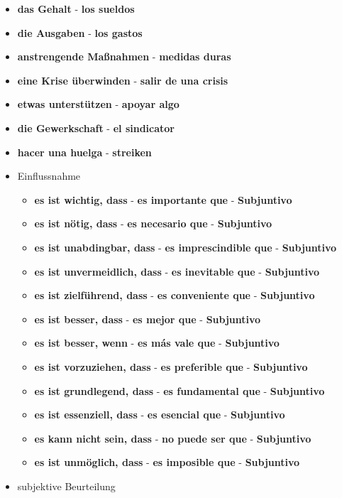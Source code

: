 \documentclass{article}
\begin{document}
\begin{multicols}{2}
\begin{itemize}
		\item{\textbf{das Gehalt} - \textbf{los sueldos}}
		\item{\textbf{die Ausgaben} - \textbf{los gastos}}
		\item{\textbf{anstrengende Maßnahmen} - \textbf{medidas duras}}
		\item{\textbf{eine Krise überwinden} - \textbf{salir de una crisis}}
		\item{\textbf{etwas unterstützen} - \textbf{apoyar algo}}
		\item{\textbf{die Gewerkschaft} - \textbf{el sindicator}}
		\item{\textbf{hacer una huelga} - \textbf{streiken}}
	\end{itemize}
	\newpage
	\begin{itemize}
		\item{Einflussnahme}
		\begin{itemize}
			\item{\textbf{es ist wichtig, dass} - \textbf{es importante que} - \textbf{Subjuntivo}}
			\item{\textbf{es ist nötig, dass} - \textbf{es necesario que} - \textbf{Subjuntivo}}
			\item{\textbf{es ist unabdingbar, dass} - \textbf{es imprescindible que} - \textbf{Subjuntivo}}
			\item{\textbf{es ist unvermeidlich, dass} - \textbf{es inevitable que} - \textbf{Subjuntivo}}
			\item{\textbf{es ist zielführend, dass} - \textbf{es conveniente que} - \textbf{Subjuntivo}}
			\item{\textbf{es ist besser, dass} - \textbf{es mejor que} - \textbf{Subjuntivo}}
			\item{\textbf{es ist besser, wenn} - \textbf{es más vale que} - \textbf{Subjuntivo}}
			\item{\textbf{es ist vorzuziehen, dass} - \textbf{es preferible que} - \textbf{Subjuntivo}}
			\item{\textbf{es ist grundlegend, dass} - \textbf{es fundamental que} - \textbf{Subjuntivo}}
			\item{\textbf{es ist essenziell, dass} - \textbf{es esencial que} - \textbf{Subjuntivo}}
			\item{\textbf{es kann nicht sein, dass} - \textbf{no puede ser que} - \textbf{Subjuntivo}}
			\item{\textbf{es ist unmöglich, dass} - \textbf{es imposible que} - \textbf{Subjuntivo}}
		\end{itemize}
		\item{subjektive Beurteilung}

\end{itemize}
\end{multicols}
\end{document}
